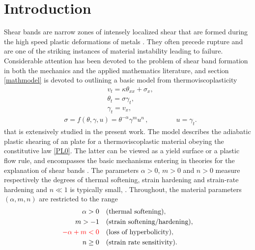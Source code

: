 \documentclass[a4paper,11pt]{article}
\def\red{\color{red}}
\theoremstyle{remark}
\begin{document}
\vfil\eject


\section{Introduction}

Shear bands are narrow zones of intensely localized shear that are formed during the high speed plastic deformations of metals \cite{ZH44, Clifton90,Wright02}.
They often precede rupture and are one of the striking instances of material instability leading to failure.  Considerable attention has been devoted to the
problem of shear band formation in both the mechanics and the applied mathematics literature, and section \ref{mathmodel} is devoted to outlining
a basic model from thermoviscoplasticity
\begin{equation}
  \label{sbeq}
  \begin{aligned}
    & v_{t} =  \kappa \theta_{ x x} +  \sigma_{x},\\
    & \theta_{t} =  \sigma \gamma_{t}, \\
    & \gamma_{t} = v_{x},
  \end{aligned}
\end{equation}
\begin{align}
&  \sigma =  f(\theta, \gamma, u) = \theta^{-\alpha} \gamma^{m} u^{n} \, , \quad \quad \qquad \text{$u = \gamma_t$}. \label{PL0}
\end{align}
that is extensively studied in the present work. The model describes the adiabatic plastic shearing of an plate for
a thermoviscoplastic material obeying the constitutive law \eqref{PL0}. The latter can be viewed as a yield surface or a plastic flow rule, and encompasses the basic
mechanisms entering in theories for the explanation of shear bands \cite{ZH44,Clifton90}.
The parameters $\alpha>0$, $m>0$ and $n>0$ measure respectively the degrees of thermal softening, strain hardening and  strain-rate hardening and $n \ll 1$
is typically small, \cite{Clifton90}.
Throughout, the material parameters $(\alpha,m,n)$ are restricted to the range
\begin{equation}
 \begin{aligned}
  \alpha>0\quad&\text{(thermal softening)},\\
  m>-1 \quad&\text{(strain softening/hardening)}, \\%
  \red-\alpha+m<0 \quad&\text{(loss of hyperbolicity)},\\%
  n\ge0 \quad&\text{(strain rate sensitivity)}. %
\end{aligned}\label{eq:paramrange}
\end{equation}
\end{document}
